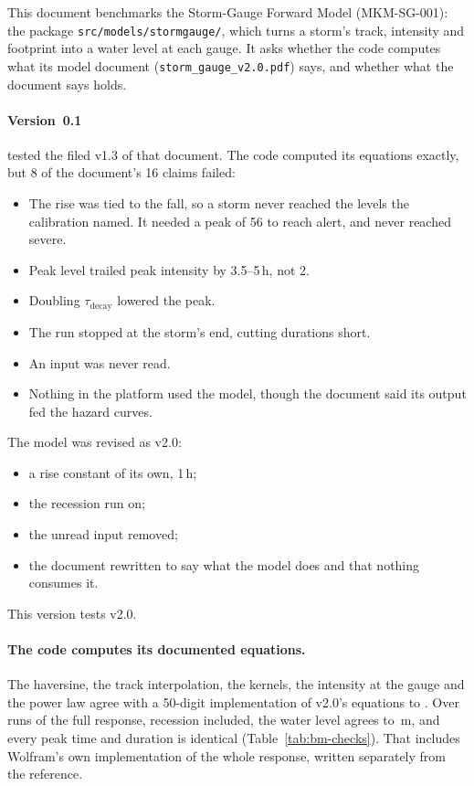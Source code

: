 \documentclass[11pt,a4paper]{article}
\begin{document}
\sloppy

\mkmtitlepage
\mkmlegalpage

\tableofcontents
\clearpage

\mkmexecsummary

This document benchmarks the Storm-Gauge Forward Model (MKM-SG-001): the package
\texttt{src/models/stormgauge/}, which turns a storm's track, intensity and footprint into
a water level at each gauge. It asks whether the code computes what its model document
(\texttt{storm\_gauge\_v2.0.pdf}) says, and whether what the document says holds.

\paragraph{Version~0.1} tested the filed v1.3 of that document. The code computed its
equations exactly, but 8 of the document's 16 claims failed:
\begin{itemize}[leftmargin=*,nosep]
\item The rise was tied to the fall, so a storm never reached the levels the calibration
  named. It needed a peak of 56 to reach alert, and never reached severe.
\item Peak level trailed peak intensity by 3.5--5\,h, not 2.
\item Doubling $\tau_{\mathrm{decay}}$ lowered the peak.
\item The run stopped at the storm's end, cutting durations short.
\item An input was never read.
\item Nothing in the platform used the model, though the document said its output fed
  the hazard curves.
\end{itemize}
The model was revised as v2.0:
\begin{itemize}[leftmargin=*,nosep]
\item a rise constant of its own, 1\,h;
\item the recession run on;
\item the unread input removed;
\item the document rewritten to say what the model does and that nothing consumes it.
\end{itemize}
This version tests v2.0.

\paragraph{The code computes its documented equations.} The haversine, the track
interpolation, the kernels, the intensity at the gauge and the power law agree with a
50-digit implementation of v2.0's equations to \bmCodeErr. Over \bmRuns{} runs of the
full response, recession included, the water level agrees to \bmLevelErr\,m, and every
peak time and duration is identical (Table~\ref{tab:bm-checks}). \bmWolframConfirms{}
That includes Wolfram's own implementation of the whole response, written separately
from the reference.
\end{document}
